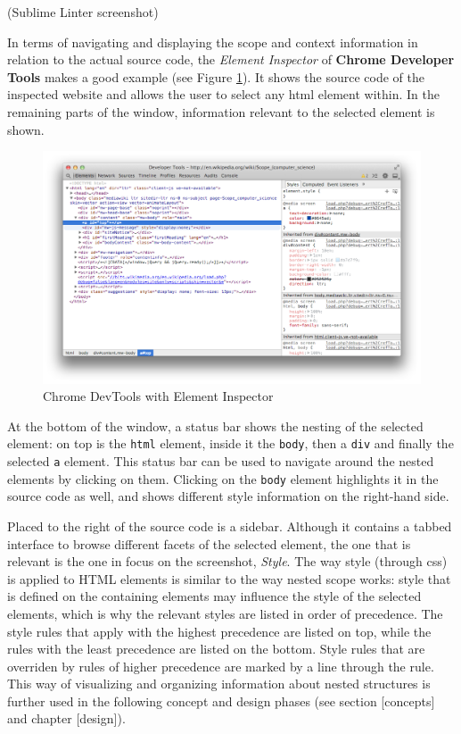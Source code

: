 (Sublime Linter screenshot)

In terms of navigating and displaying the scope and context information
in relation to the actual source code, the \emph{Element Inspector} of
\textbf{Chrome Developer Tools} makes a good example (see Figure
\ref{fig:devtools}). It shows the source code of the inspected website
and allows the user to select any \ac{html} element within. In the
remaining parts of the window, information relevant to the selected
element is shown.

\begin{figure}[htbp]
\centering
\includegraphics[keepaspectratio,width=\textwidth,height=0.75\textheight]{img/devtools.png}
\caption{Chrome DevTools with Element Inspector}
\label{fig:devtools}
\end{figure}

At the bottom of the window, a status bar shows the nesting of the
selected element: on top is the \texttt{html} element, inside it the
\texttt{body}, then a \texttt{div} and finally the selected \texttt{a}
element. This status bar can be used to navigate around the nested
elements by clicking on them. Clicking on the \texttt{body} element
highlights it in the source code as well, and shows different style
information on the right-hand side.

Placed to the right of the source code is a sidebar. Although it
contains a tabbed interface to browse different facets of the selected
element, the one that is relevant is the one in focus on the screenshot,
\emph{Style}. The way style (through \ac{css}) is applied to HTML
elements is similar to the way nested scope works: style that is defined
on the containing elements may influence the style of the selected
elements, which is why the relevant styles are listed in order of
precedence. The style rules that apply with the highest precedence are
listed on top, while the rules with the least precedence are listed on
the bottom. Style rules that are overriden by rules of higher precedence
are marked by a line through the rule. This way of visualizing and
organizing information about nested structures is further used in the
following concept and design phases (see section {[}concepts{]} and
chapter {[}design{]}).

